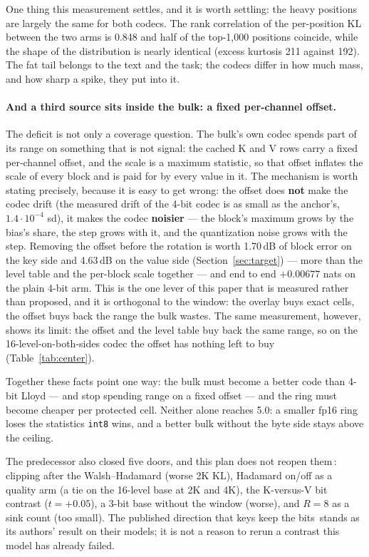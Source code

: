 \documentclass[10pt,twocolumn]{article}
\begin{document}
One thing this measurement settles, and it is worth settling: the heavy positions are largely the same for both codecs. The rank correlation of the per-position KL between the two arms is 0.848 and half of the top-1,000 positions coincide, while the shape of the distribution is nearly identical (excess kurtosis 211 against 192). The fat tail belongs to the text and the task; the codecs differ in how much mass, and how sharp a spike, they put into it.

\paragraph{And a third source sits inside the bulk: a fixed per-channel offset.} The deficit is not only a coverage question. The bulk's own codec spends part of its range on something that is not signal: the cached K and V rows carry a fixed per-channel offset, and the scale is a maximum statistic, so that offset inflates the scale of every block and is paid for by every value in it. The mechanism is worth stating precisely, because it is easy to get wrong: the offset does \textbf{not} make the codec drift (the measured drift of the 4-bit codec is as small as the anchor's, $1.4\cdot10^{-4}$ sd), it makes the codec \textbf{noisier} --- the block's maximum grows by the bias's share, the step grows with it, and the quantization noise grows with the step. Removing the offset before the rotation is worth 1.70\,dB of block error on the key side and 4.63\,dB on the value side (Section~\ref{sec:target}) --- more than the level table and the per-block scale together --- and end to end $+0.00677$ nats on the plain 4-bit arm. This is the one lever of this paper that is measured rather than proposed, and it is orthogonal to the window: the overlay buys exact cells, the offset buys back the range the bulk wastes. The same measurement, however, shows its limit: the offset and the level table buy back the same range, so on the 16-level-on-both-sides codec the offset has nothing left to buy (Table~\ref{tab:center}).

Together these facts point one way: the bulk must become a better code than 4-bit Lloyd --- and stop spending range on a fixed offset --- and the ring must become cheaper per protected cell. Neither alone reaches 5.0: a smaller fp16 ring loses the statistics \texttt{int8} wins, and a better bulk without the byte side stays above the ceiling.

The predecessor also closed five doors, and this plan does not reopen them\,\cite{strata-wp}: clipping after the Walsh--Hadamard (worse 2K KL), Hadamard on/off as a quality arm (a tie on the 16-level base at 2K and 4K), the K-versus-V bit contrast ($t{=}+0.05$), a 3-bit base without the window (worse), and $R{=}8$ as a sink count (too small). The published direction that keys keep the bits\,\cite{spectralkv} stands as its authors' result on their models; it is not a reason to rerun a contrast this model has already failed.
\end{document}
